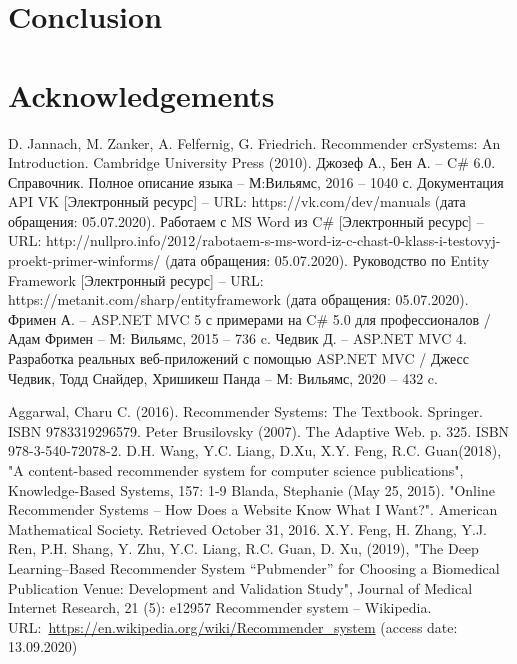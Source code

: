 \documentclass[conference]{IEEEtran}
\begin{document}
\section*{Conclusion}
\label{sec:conc}


\section*{Acknowledgements}
\label{sec:ack}


\begin{thebibliography}{99}
 D. Jannach, M. Zanker, A. Felfernig, G. Friedrich. Recommender crSystems: An Introduction. Cambridge University Press (2010).
  Джозеф А., Бен А. – C\# 6.0. Справочник. Полное описание языка – М:Вильямс, 2016 – 1040 с.
Документация API VK [Электронный ресурс] – URL: https://vk.com/dev/manuals (дата обращения: 05.07.2020).
Работаем с MS Word из C\# [Электронный ресурс] – URL: http://nullpro.info/2012/rabotaem-s-ms-word-iz-c-chast-0-klass-i-testovyj-proekt-primer-winforms/ (дата обращения: 05.07.2020).
Руководство по Entity Framework [Электронный ресурс] – URL: https://metanit.com/sharp/entityframework (дата обращения: 05.07.2020).
Фримен А. – ASP.NET MVC 5 с примерами на C\# 5.0 для профессионалов / Адам Фримен – М: Вильямс, 2015 – 736 c.
Чедвик Д. – ASP.NET MVC 4. Разработка реальных веб-приложений с помощью ASP.NET MVC / Джесс Чедвик, Тодд Снайдер, Хришикеш Панда – М: Вильямс, 2020 – 432 c.

Aggarwal, Charu C. (2016). Recommender Systems: The Textbook. Springer. ISBN 9783319296579.
Peter Brusilovsky (2007). The Adaptive Web. p. 325. ISBN 978-3-540-72078-2.
D.H. Wang, Y.C. Liang, D.Xu, X.Y. Feng, R.C. Guan(2018), "A content-based recommender system for computer science publications", Knowledge-Based Systems, 157: 1-9
Blanda, Stephanie (May 25, 2015). "Online Recommender Systems – How Does a Website Know What I Want?". American Mathematical Society. Retrieved October 31, 2016.
X.Y. Feng, H. Zhang, Y.J. Ren, P.H. Shang, Y. Zhu, Y.C. Liang, R.C. Guan, D. Xu, (2019), "The Deep Learning–Based Recommender System “Pubmender” for Choosing a Biomedical Publication Venue: Development and Validation Study", Journal of Medical Internet Research, 21 (5): e12957
Recommender system -- Wikipedia. URL:~\url{https://en.wikipedia.org/wiki/Recommender_system} (access date: 13.09.2020)
\end{thebibliography}
\end{document}
